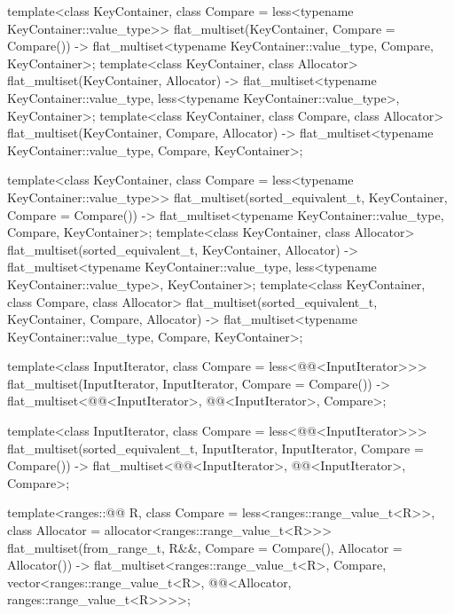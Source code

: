 \begin{codeblock}
{  template<class KeyContainer, class Compare = less<typename KeyContainer::value_type>>
    flat_multiset(KeyContainer, Compare = Compare())
      -> flat_multiset<typename KeyContainer::value_type, Compare, KeyContainer>;
  template<class KeyContainer, class Allocator>
    flat_multiset(KeyContainer, Allocator)
      -> flat_multiset<typename KeyContainer::value_type,
                       less<typename KeyContainer::value_type>, KeyContainer>;
  template<class KeyContainer, class Compare, class Allocator>
    flat_multiset(KeyContainer, Compare, Allocator)
      -> flat_multiset<typename KeyContainer::value_type, Compare, KeyContainer>;

  template<class KeyContainer, class Compare = less<typename KeyContainer::value_type>>
    flat_multiset(sorted_equivalent_t, KeyContainer, Compare = Compare())
      -> flat_multiset<typename KeyContainer::value_type, Compare, KeyContainer>;
  template<class KeyContainer, class Allocator>
    flat_multiset(sorted_equivalent_t, KeyContainer, Allocator)
      -> flat_multiset<typename KeyContainer::value_type,
                       less<typename KeyContainer::value_type>, KeyContainer>;
  template<class KeyContainer, class Compare, class Allocator>
    flat_multiset(sorted_equivalent_t, KeyContainer, Compare, Allocator)
      -> flat_multiset<typename KeyContainer::value_type, Compare, KeyContainer>;

  template<class InputIterator, class Compare = less<@@<InputIterator>>>
    flat_multiset(InputIterator, InputIterator, Compare = Compare())
      -> flat_multiset<@@<InputIterator>, @@<InputIterator>, Compare>;

  template<class InputIterator, class Compare = less<@@<InputIterator>>>
    flat_multiset(sorted_equivalent_t, InputIterator, InputIterator, Compare = Compare())
      -> flat_multiset<@@<InputIterator>, @@<InputIterator>, Compare>;

  template<ranges::@@ R, class Compare = less<ranges::range_value_t<R>>,
           class Allocator = allocator<ranges::range_value_t<R>>>
    flat_multiset(from_range_t, R&&, Compare = Compare(), Allocator = Allocator())
      -> flat_multiset<ranges::range_value_t<R>, Compare,
                       vector<ranges::range_value_t<R>,
                              @@<Allocator, ranges::range_value_t<R>>>>;

}
\end{codeblock}
